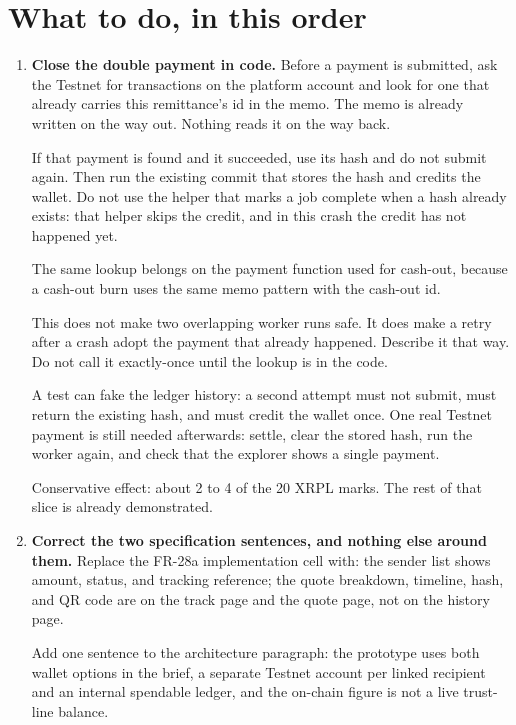 \documentclass[11pt,a4paper]{article}
\begin{document}
\section{What to do, in this order}

\begin{enumerate}
\item \textbf{Close the double payment in code.}
Before a payment is submitted, ask the Testnet for transactions on the platform account and look for one that already carries this remittance's id in the memo. The memo is already written on the way out. Nothing reads it on the way back.

If that payment is found and it succeeded, use its hash and do not submit again. Then run the existing commit that stores the hash and credits the wallet. Do not use the helper that marks a job complete when a hash already exists: that helper skips the credit, and in this crash the credit has not happened yet.

The same lookup belongs on the payment function used for cash-out, because a cash-out burn uses the same memo pattern with the cash-out id.

This does not make two overlapping worker runs safe. It does make a retry after a crash adopt the payment that already happened. Describe it that way. Do not call it exactly-once until the lookup is in the code.

A test can fake the ledger history: a second attempt must not submit, must return the existing hash, and must credit the wallet once. One real Testnet payment is still needed afterwards: settle, clear the stored hash, run the worker again, and check that the explorer shows a single payment.

Conservative effect: about 2 to 4 of the 20 XRPL marks. The rest of that slice is already demonstrated.

\item \textbf{Correct the two specification sentences, and nothing else around them.}
Replace the FR-28a implementation cell with: the sender list shows amount, status, and tracking reference; the quote breakdown, timeline, hash, and QR code are on the track page and the quote page, not on the history page.

Add one sentence to the architecture paragraph: the prototype uses both wallet options in the brief, a separate Testnet account per linked recipient and an internal spendable ledger, and the on-chain figure is not a live trust-line balance.


\end{enumerate}
\end{document}
